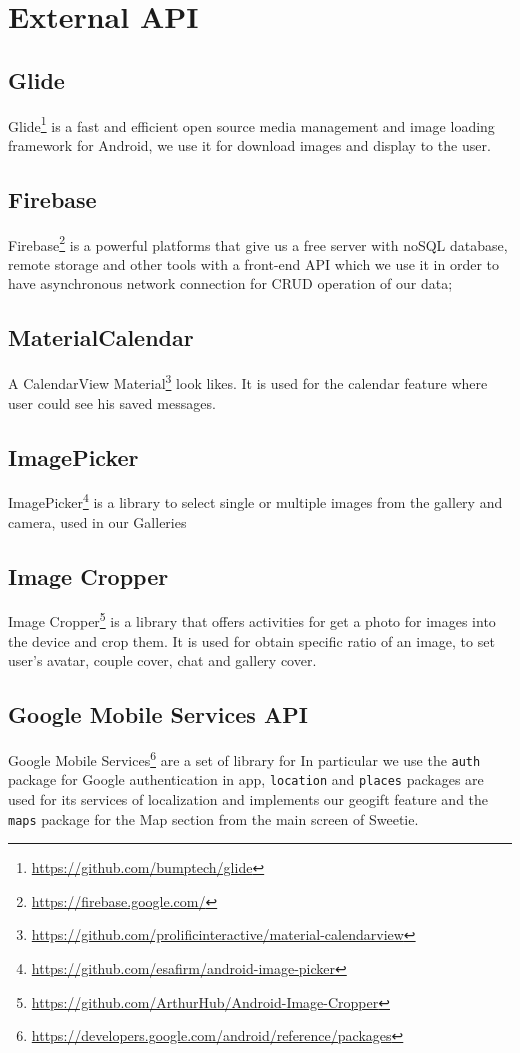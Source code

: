 
\section{External API}
\label{sec:ext_api} 

\subsection{Glide}
Glide\footnote{\url{https://github.com/bumptech/glide}} is a fast and efficient open source media management and image loading framework for Android, we use it for download images and display to the user.

\subsection{Firebase}
Firebase\footnote{\url{https://firebase.google.com/}} is a powerful platforms that give us a free server with noSQL database, remote storage and other tools with a front-end API which we use it in order to have asynchronous network connection for CRUD operation of our data;

\subsection{MaterialCalendar}
A CalendarView Material\footnote{\url{https://github.com/prolificinteractive/material-calendarview}} look likes. It is used for the calendar feature where user could see his saved messages.

\subsection{ImagePicker}
ImagePicker\footnote{\url{https://github.com/esafirm/android-image-picker}} is a library to select single or multiple images from the gallery and camera, used in our Galleries 

\subsection{Image Cropper}
Image Cropper\footnote{\url{https://github.com/ArthurHub/Android-Image-Cropper}} is a library that offers activities for get a photo for images into the device and crop them. It is used for obtain specific ratio of an image, to set user's avatar, couple cover, chat and gallery cover.

\subsection{Google Mobile Services API}
Google Mobile Services\footnote{\url{https://developers.google.com/android/reference/packages}} are a set of library for In particular we use the \texttt{auth} package for Google authentication in app, \texttt{location} and \texttt{places} packages are used for its services of localization and implements our geogift feature and the \texttt{maps} package for the Map section from the main screen of Sweetie.